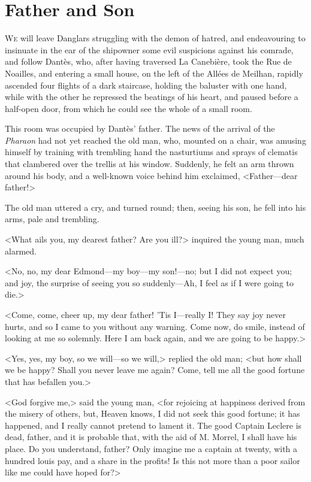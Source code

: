 \chapter{Father and Son} 

 \lettrine{W}{e} will leave Danglars struggling with the demon of hatred, and endeavouring to insinuate in the ear of the shipowner some evil suspicions against his comrade, and follow Dantès, who, after having traversed La Canebière, took the Rue de Noailles, and entering a small house, on the left of the Allées de Meilhan, rapidly ascended four flights of a dark staircase, holding the baluster with one hand, while with the other he repressed the beatings of his heart, and paused before a half-open door, from which he could see the whole of a small room. 

 This room was occupied by Dantès' father. The news of the arrival of the \textit{Pharaon} had not yet reached the old man, who, mounted on a chair, was amusing himself by training with trembling hand the nasturtiums and sprays of clematis that clambered over the trellis at his window. Suddenly, he felt an arm thrown around his body, and a well-known voice behind him exclaimed, <Father—dear father!> 

 The old man uttered a cry, and turned round; then, seeing his son, he fell into his arms, pale and trembling. 

 <What ails you, my dearest father? Are you ill?> inquired the young man, much alarmed. 

 <No, no, my dear Edmond—my boy—my son!—no; but I did not expect you; and joy, the surprise of seeing you so suddenly—Ah, I feel as if I were going to die.> 

 <Come, come, cheer up, my dear father! 'Tis I—really I\@! They say joy never hurts, and so I came to you without any warning. Come now, do smile, instead of looking at me so solemnly. Here I am back again, and we are going to be happy.> 

 <Yes, yes, my boy, so we will—so we will,> replied the old man; <but how shall we be happy? Shall you never leave me again? Come, tell me all the good fortune that has befallen you.> 

 <God forgive me,> said the young man, <for rejoicing at happiness derived from the misery of others, but, Heaven knows, I did not seek this good fortune; it has happened, and I really cannot pretend to lament it. The good Captain Leclere is dead, father, and it is probable that, with the aid of M. Morrel, I shall have his place. Do you understand, father? Only imagine me a captain at twenty, with a hundred louis pay, and a share in the profits! Is this not more than a poor sailor like me could have hoped for?> 

